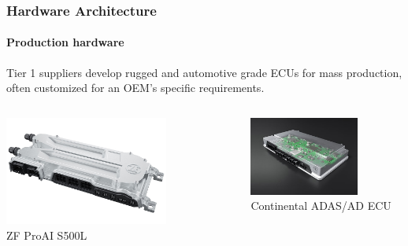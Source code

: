 \begin{frame}
\frametitle{Hardware Architecture}
\framesubtitle{Production hardware}
Tier 1 suppliers develop rugged and automotive grade ECUs for mass production,
often customized for an OEM's specific requirements.\\
\vspace{0.2cm}
\begin{columns}[]
    \begin{column}{0.5\textwidth}
        \centering
        \includegraphics[width=0.7\textwidth]{images/zf_proai_s500l.jpg}\\
        \footnotesize ZF ProAI S500L\footnotemark[1]
    \end{column}
    \begin{column}{0.5\textwidth}
        \centering
        \includegraphics[width=0.7\textwidth]{images/continental_ecu.jpg}\\
        \footnotesize Continental ADAS/AD ECU\footnotemark[2]
    \end{column}
\end{columns}
\end{frame}

